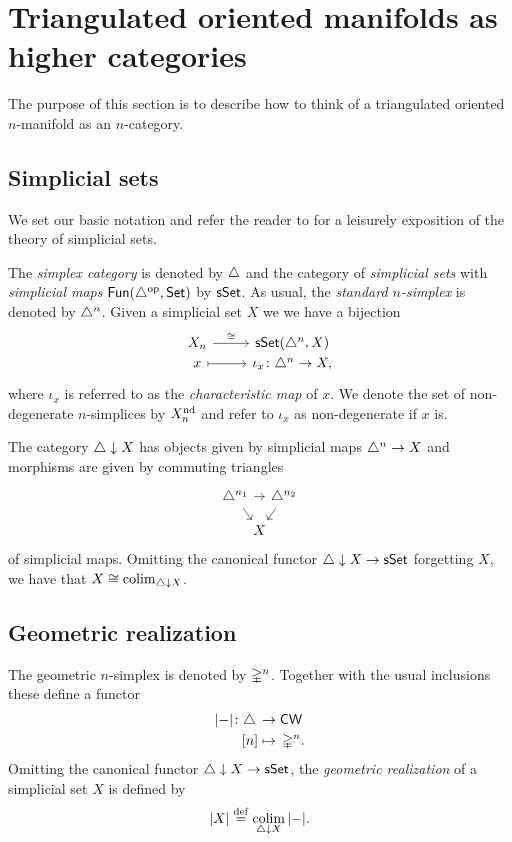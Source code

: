 
\section{Triangulated oriented manifolds as higher categories}

The purpose of this section is to describe how to think of a triangulated oriented $n$-manifold as an $n$-category.

\subsection{Simplicial sets}

We set our basic notation and refer the reader to \cite{friedman2021simplicial} for a leisurely exposition of the theory of simplicial sets.

The \textit{simplex category} is denoted by $\triangle$ and the category of \textit{simplicial sets} with \textit{simplicial maps} $\mathsf{Fun}(\triangle^{\mathrm{op}}, \mathsf{Set})$ by $\mathsf{sSet}$.
As usual, the \textit{standard $n$-simplex} is denoted by $\triangle^n$.
Given a simplicial set $X$ we we have a bijection
\[
\begin{tikzcd}[row sep=-2pt]
	X_n \arrow[r,"\cong"] & \sSet(\simplex^n, X) \\
	x \arrow[r,mapsto] & \iota_x \colon \simplex^n \to X,
\end{tikzcd}
\]
where $\iota_x$ is referred to as the \textit{characteristic map} of $x$.
We denote the set of non-degenerate $n$-simplices by $X_n^{\mathrm{nd}}$ and refer to $\iota_x$ as non-degenerate if $x$ is.

The category $\triangle \downarrow X$ has objects given by simplicial maps $\triangle^n \to X$ and morphisms are given by commuting triangles
\[
\begin{tikzcd}[column sep=-5pt, row sep=small]
	\simplex^{n_1} \arrow[dr] \arrow[rr] & & \simplex^{n_2}  \arrow[dl] \\
	& X &
\end{tikzcd}
\]
of simplicial maps.
Omitting the canonical functor $\triangle \downarrow X \to \mathsf{sSet}$ forgetting $X$, we have that $X \cong \operatorname*{colim}_{\triangle \downarrow X}$.

\subsection{Geometric realization}

The geometric $n$-simplex is denoted by $\mathbb{\Delta}^n$.
Together with the usual inclusions these define a functor
\[
\begin{split}
	\lvert-\rvert \colon \triangle \, &\to \mathsf{CW} \\
	[n] &\mapsto \, \mathbb{\Delta}^n.
\end{split}
\]
Omitting the canonical functor $\triangle \downarrow X \to \mathsf{sSet}$, the \textit{geometric realization} of a simplicial set $X$ is defined by
\[
\lvert X\rvert \stackrel{\mathrm{def}}{=} \operatorname*{colim}_{\triangle \downarrow X} \,\lvert-\rvert.
\]

